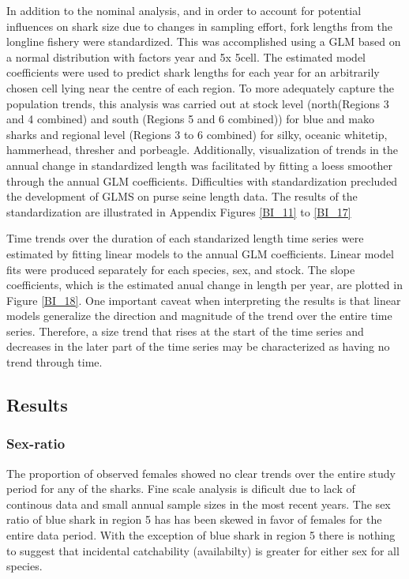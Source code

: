 \documentclass[12pt]{SCreport}
\begin{document}
In addition to the nominal analysis, and in order to account for potential influences on shark size due to changes in sampling effort, fork lengths from the longline fishery were standardized. This was accomplished using a GLM based on a normal distribution with factors year and 5\degree x 5\degree cell. The estimated model coefficients were used to predict shark lengths for each year for an arbitrarily chosen cell lying near the centre of each region. To more adequately capture the population trends, this analysis was carried out at stock level (north(Regions 3 and 4 combined) and south (Regions 5 and 6 combined)) for blue and mako sharks and regional level (Regions 3 to 6 combined) for silky, oceanic whitetip, hammerhead, thresher and porbeagle.  Additionally, visualization of trends in the annual change in standardized length was facilitated by fitting a loess smoother through the annual GLM coefficients.  Difficulties with standardization precluded the development of GLMS on purse seine length data. The results of the standardization are illustrated in Appendix Figures \ref{BI_11} to \ref{BI_17}

Time trends over the duration of each standarized length time series were estimated by fitting linear models to the annual GLM coefficients.  Linear model fits were produced separately for each species, sex, and stock.   The slope coefficients, which is the estimated anual change in length per year, are plotted in Figure \ref{BI_18}.  One important caveat when interpreting the results is that linear models generalize the direction and magnitude of the trend over the entire time series. Therefore, a size trend that rises at the start of the time series and decreases in the later part of the time series may be characterized as having no trend through time.

\subsection{Results}
\subsubsection{Sex-ratio}
    The proportion of observed females showed no clear trends over the entire study period for any of the sharks.  Fine scale analysis is dificult due to lack of continous data and small annual sample sizes in the most recent years.   The sex ratio of blue shark in region 5 has has been skewed in favor of females for the entire data period. With the exception of blue shark in region 5 there is nothing to suggest that incidental catchability (availabilty) is greater for either sex for all species.
    
\end{document}
